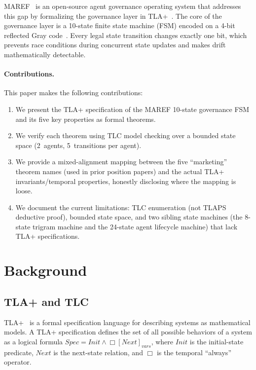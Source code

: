 \documentclass[11pt]{article}
\begin{document}
MAREF~\cite{maref-repo} is an open-source agent governance operating system
that addresses this gap by formalizing the governance layer in TLA+~\cite{lamport-specifying}.
The core of the governance layer is a 10-state finite state machine (FSM)
encoded on a 4-bit reflected Gray code~\cite{gray-patent}. Every legal state
transition changes exactly one bit, which prevents race conditions during
concurrent state updates and makes drift mathematically detectable.

\paragraph{Contributions.}
This paper makes the following contributions:
\begin{enumerate}
  \item We present the TLA+ specification of the MAREF 10-state governance FSM
    and its five key properties as formal theorems.
  \item We verify each theorem using TLC model checking over a bounded state
    space (2~agents, 5~transitions per agent).
  \item We provide a mixed-alignment mapping between the five ``marketing''
    theorem names (used in prior position papers) and the actual TLA+
    invariants/temporal properties, honestly disclosing where the mapping is
    loose.
  \item We document the current limitations: TLC enumeration (not TLAPS
    deductive proof), bounded state space, and two sibling state machines (the
    8-state trigram machine and the 24-state agent lifecycle machine) that lack
    TLA+ specifications.
\end{enumerate}

\section{Background}

\subsection{TLA+ and TLC}

TLA+~\cite{lamport-specifying} is a formal specification language for
describing systems as mathematical models. A TLA+ specification defines the
set of all possible behaviors of a system as a logical formula
$\mathit{Spec} = \mathit{Init} \land \Box[\mathit{Next}]_{\mathit{vars}}$,
where $\mathit{Init}$ is the initial-state predicate, $\mathit{Next}$ is the
next-state relation, and $\Box$ is the temporal ``always'' operator.
\end{document}
